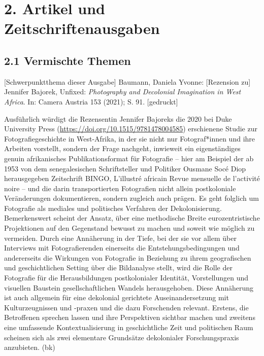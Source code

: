 \documentclass[a4paper,
fontsize=11pt,
oneside,
numbers=noperiodatend,
parskip=half-,
bibliography=totoc,
final
]{scrartcl}
\begin{document}
\hypertarget{artikel-und-zeitschriftenausgaben}{%
\section{2. Artikel und
Zeitschriftenausgaben}\label{artikel-und-zeitschriftenausgaben}}

\hypertarget{vermischte-themen}{%
\subsection{2.1 Vermischte Themen}\label{vermischte-themen}}

{[}Schwerpunktthema dieser Ausgabe{]} Baumann, Daniela Yvonne:
{[}Rezension zu{]} Jennifer Bajorek, Unfixed: \emph{Photography and
Decolonial Imagination in West Africa}. In: Camera Austria 153 (2021);
S. 91. {[}gedruckt{]}

Ausführlich würdigt die Rezensentin Jennifer Bajoreks die 2020 bei Duke
University Press (\url{https://doi.org/10.1515/9781478004585})
erschienene Studie zur Fotografiegeschichte in West-Afrika, in der sie
nicht nur Fotograf*innen und ihre Arbeiten vorstellt, sondern der Frage
nachgeht, inwieweit ein eigenständiges genuin afrikanisches
Publikationsformat für Fotografie -- hier am Beispiel der ab 1953 von
dem senegalesischen Schriftsteller und Politiker Ousmane Socé Diop
herausgegeben Zeitschrift BINGO, L'illustré africain Revue mensuelle de
l'activité noire -- und die darin transportierten Fotografien nicht
allein postkoloniale Veränderungen dokumentieren, sondern zugleich auch
prägen. Es geht folglich um Fotografie als mediales und politisches
Verfahren der Dekolonisierung. Bemerkenswert scheint der Ansatz, über
eine methodische Breite eurozentristische Projektionen auf den
Gegenstand bewusst zu machen und soweit wie möglich zu vermeiden. Durch
eine Annäherung in der Tiefe, bei der sie vor allem über Interviews mit
Fotografierenden einerseits die Entstehungsbedingungen und andererseits
die Wirkungen von Fotografie in Beziehung zu ihrem geografischen und
geschichtlichen Setting über die Bildanalyse stellt, wird die Rolle der
Fotografie für die Herausbildungen postkolonialer Identität,
Vorstellungen und visuellen Baustein gesellschaftlichen Wandels
herausgehoben. Diese Annäherung ist auch allgemein für eine dekolonial
gerichtete Auseinandersetzung mit Kulturzeugnissen und -praxen und die
dazu Forschenden relevant. Erstens, die Betroffenen sprechen lassen und
ihre Perspektiven sichtbar machen und zweitens eine umfassende
Kontextualisierung in geschichtliche Zeit und politischen Raum scheinen
sich als zwei elementare Grundsätze dekolonialer Forschungspraxis
anzubieten. (bk)
\end{document}
